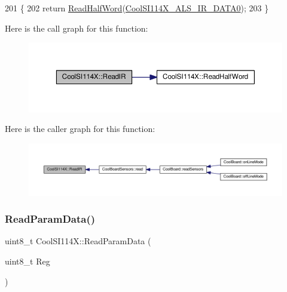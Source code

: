 \begin{DoxyCode}
201 \{
202   \textcolor{keywordflow}{return} \hyperlink{class_cool_s_i114_x_a1d25c9e137874af529804c2ec796a6b9}{ReadHalfWord}(\hyperlink{_cool_s_i114_x_8h_a30228ef7ee17ebabdf5d8e9c74e4702a}{CoolSI114X\_ALS\_IR\_DATA0});  
203 \} 
\end{DoxyCode}
Here is the call graph for this function\+:\nopagebreak
\begin{figure}[H]
\begin{center}
\leavevmode
\includegraphics[width=350pt]{dd/d67/class_cool_s_i114_x_abc536ee7ae8e3ba9d1069acc3889a2cf_cgraph}
\end{center}
\end{figure}
Here is the caller graph for this function\+:\nopagebreak
\begin{figure}[H]
\begin{center}
\leavevmode
\includegraphics[width=350pt]{dd/d67/class_cool_s_i114_x_abc536ee7ae8e3ba9d1069acc3889a2cf_icgraph}
\end{center}
\end{figure}
\mbox{\label{class_cool_s_i114_x_a33cf431103c722442f6a0cc93848d640}} 
\subsubsection{\texorpdfstring{Read\+Param\+Data()}{ReadParamData()}}
{\footnotesize\ttfamily uint8\+\_\+t Cool\+S\+I114\+X\+::\+Read\+Param\+Data (\begin{DoxyParamCaption}\item[{uint8\+\_\+t}]{Reg }\end{DoxyParamCaption})}



